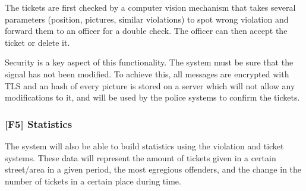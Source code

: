 The tickets are first checked by a computer vision mechanism that takes several parameters (position, pictures,
similar violations) to spot wrong violation and forward them to an officer for a double check. The officer can then
accept the ticket or delete it.

Security is a key aspect of this functionality. The system must be sure that the signal has not been modified.
To achieve this, all messages are encrypted with TLS and an hash of every picture is stored on a server which will not
allow any modifications to it, and will be used by the police systems to confirm the tickets.

\subsubsection[Statistics]{[F5] Statistics\hypertarget{sec:f5}{}}
The system will also be able to build statistics using the violation and ticket systems.
These data will represent the amount of tickets given in a certain street/area in a given period, the most egregious offenders, and the change in the number of tickets in a certain place during time.
\clearpage